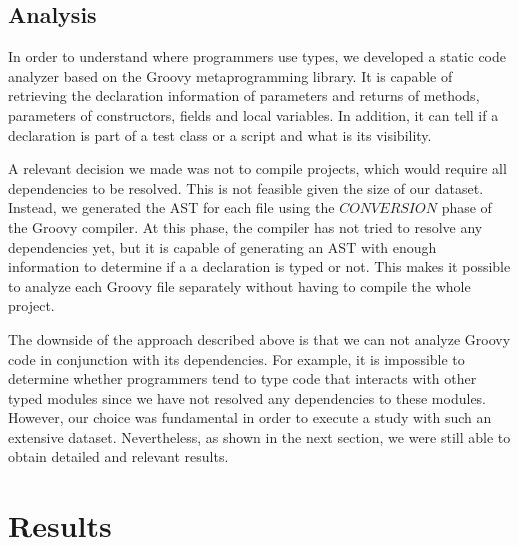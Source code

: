 \documentclass[preprint]{sigplanconf}
\begin{document}
\subsection{Analysis\label{analyzer}}
In order to understand where programmers use types, we developed a static code analyzer based on the Groovy metaprogramming library.
It is capable of retrieving the declaration information of parameters and returns of methods, parameters of constructors, fields and local variables.
In addition, it can tell if a declaration is part of a test class or a script and what is its visibility.

A relevant decision we made was not to compile projects, which would require all dependencies to be resolved.
This is not feasible given the size of our dataset.
Instead, we generated the AST for each file using the $CONVERSION$ phase of the Groovy compiler.
At this phase, the compiler has not tried to resolve any dependencies yet, but it is capable of generating an AST with enough information to determine if a a declaration is typed or not.
This makes it possible to analyze each Groovy file separately without having to compile the whole project.

The downside of the approach described above is that we can not analyze Groovy code in conjunction with its dependencies. 
For example, it is impossible to determine whether programmers tend to type code that interacts with other typed modules since we have not resolved any dependencies to these modules.
However, our choice was fundamental in order to execute a study with such an extensive dataset.
Nevertheless, as shown in the next section, we were still able to obtain detailed and relevant results.











%
%
\section{Results\label{results}}
\end{document}

